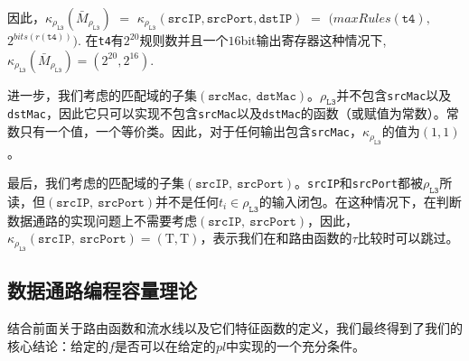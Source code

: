 因此，$\kappa_{\rho_{\texttt{L3}}}(\bar{M}_{\rho_{\texttt{L3}}})$ $=$ $\kappa_{\rho_{\texttt{L3}}}(\texttt{srcIP}, \texttt{srcPort}, \texttt{dstIP})$ $=$ $(maxRules(\texttt{t4}),$ $2^{bits(r(\texttt{t4}))})$. 在\texttt{t4}有$2^{20}$规则数并且一个$16$bit输出寄存器这种情况下, $\kappa_{\rho_{\texttt{L3}}}(\bar{M}_{\rho_{\texttt{L3}}}) = (2^{20}, 2^{16})$.

进一步，我们考虑\exampledp{}的匹配域的子集$(\texttt{srcMac},\ \texttt{dstMac})$。$\rho_{\texttt{L3}}$并不包含\texttt{srcMac}以及\texttt{dstMac}，因此它只可以实现不包含\texttt{srcMac}以及\texttt{dstMac}的函数（或赋值为常数）。常数只有一个值，一个等价类。因此，对于任何输出包含\texttt{srcMac}，$\kappa_{\rho_{\texttt{L3}}}$的值为$(1, 1)$。



最后，我们考虑\exampledp{}的匹配域的子集$(\texttt{srcIP},\ \texttt{srcPort})$。\texttt{srcIP}和\texttt{srcPort}都被$\rho_{\texttt{L3}}$所读，但$(\texttt{srcIP},\ \texttt{srcPort})$并不是任何$t_i \in \rho_{\texttt{L3}}$的输入闭包。在这种情况下，在判断数据通路的实现问题上不需要考虑$(\texttt{srcIP},\ \texttt{srcPort})$，因此，$\kappa_{\rho_{\texttt{L3}}}(\texttt{srcIP},\ \texttt{srcPort}) = (\mathrm{T}, \mathrm{T})$，表示我们在和路由函数的$\tau$比较时可以跳过。



\subsection{数据通路编程容量理论}
结合前面关于路由函数和流水线以及它们特征函数的定义，我们最终得到了我们的核心结论：给定的$f$是否可以在给定的$pl$中实现的一个充分条件。


